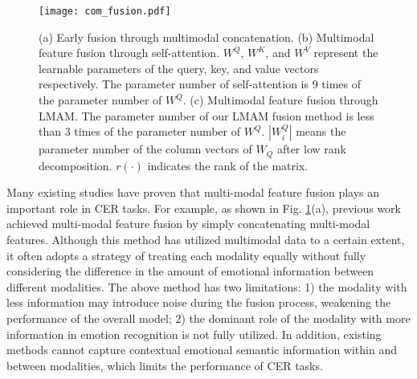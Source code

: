 \begin{figure}
	\centering
	\texttt{[image: com\_fusion.pdf]}
	\caption{(a) Early fusion through multimodal concatenation. (b) Multimodal feature fusion through self-attention. $W^Q$, $W^K$, and $W^V$ {represent} the learnable parameters of the query, key, and value vectors respectively. The parameter number of {self-attention} is 9 times of the parameter number of $W^Q$. (c) Multimodal feature fusion through LMAM. The parameter number of our LMAM fusion method is less than 3 times of the parameter number of $W^Q$. $|W^{Q}_i|$ means the parameter number of the column vectors of $W_Q$ after low rank decomposition. $r(\cdot)$ indicates the rank of the matrix.}
	\label{figure1}
\end{figure}

{Many existing studies \cite{ren2021lr, shou2022conversational, tu2022exploration} have proven that multi-modal feature fusion plays an important role in CER tasks. For example, as shown in Fig. \ref{figure1}(a), previous work \cite{cambria2018benchmarking} achieved multi-modal feature fusion by simply concatenating multi-modal features. Although this method has utilized multimodal data to a certain extent, it often adopts a strategy of treating each modality equally without fully considering the difference in the amount of emotional information between different modalities. The above method has two limitations: 1) the modality with less information may introduce noise during the fusion process, weakening the performance of the overall model; 2) the dominant role of the modality with more information in emotion recognition is not fully utilized. In addition, existing methods cannot capture contextual emotional semantic information within and between modalities, which limits the performance of CER tasks.}

